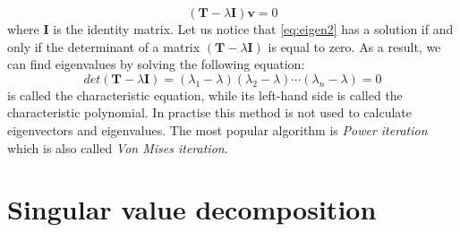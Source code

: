 \begin{appendices}
\begin{equation}\label{eq:eigen2}
    (\boldsymbol{T}-\lambda{\boldsymbol{I}})\boldsymbol{v}=0
\end{equation}
where $\boldsymbol{I}$ is the identity matrix. Let us notice that \cref{eq:eigen2} has a solution if and only if the determinant of a matrix $(\boldsymbol{T}-\lambda{\boldsymbol{I}})$ is equal to zero. As a result, we can find eigenvalues by solving the following equation:
\begin{equation}\label{eq:eigen3}
    det(\boldsymbol{T}-\lambda{\boldsymbol{I}}) = (\lambda_1-\lambda)(\lambda_2-\lambda)\cdots(\lambda_n-\lambda) = 0
\end{equation}
 is called the characteristic equation, while its left-hand side is called the characteristic polynomial. In practise this method is not used to calculate eigenvectors and eigenvalues. The most popular algorithm is \textit{Power iteration} which is also called \textit{Von Mises iteration}.


\newpage
\section{Singular value decomposition}
\label{app:svd}


\end{appendices}
